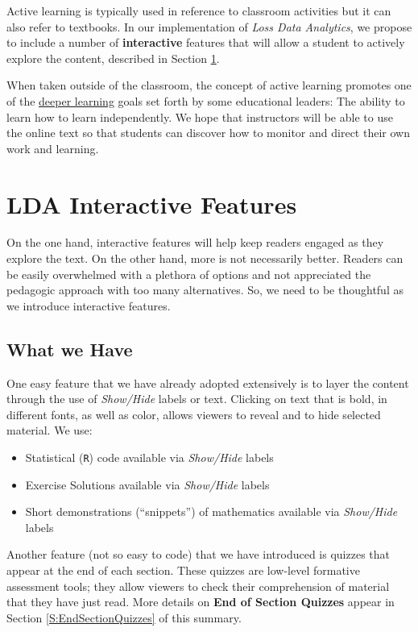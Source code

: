 \documentclass[
]{book}
\providecommand{\tightlist}{%
  \setlength{\itemsep}{0pt}\setlength{\parskip}{0pt}}
\begin{document}
Active learning is typically used in reference to classroom activities but it can also refer to textbooks. In our implementation of \emph{Loss Data Analytics}, we propose to include a number of \textbf{interactive} features that will allow a student to actively explore the content, described in Section \ref{S:Features}.

When taken outside of the classroom, the concept of active learning promotes one of the \href{http://www.hewlett.org/programs/education/deeper-learning}{deeper learning} goals set forth by some educational leaders: The ability to learn how to learn independently. We hope that instructors will be able to use the online text so that students can discover how to monitor and direct their own work and learning.

\hypertarget{S:Features}{%
\section{LDA Interactive Features}\label{S:Features}}

On the one hand, interactive features will help keep readers engaged as they explore the text. On the other hand, more is not necessarily better. Readers can be easily overwhelmed with a plethora of options and not appreciated the pedagogic approach with too many alternatives. So, we need to be thoughtful as we introduce interactive features.

\hypertarget{what-we-have}{%
\subsection{What we Have}\label{what-we-have}}

One easy feature that we have already adopted extensively is to layer the content through the use of \emph{Show/Hide} labels or text. Clicking on text that is bold, in different fonts, as well as color, allows viewers to reveal and to hide selected material. We use:

\begin{itemize}
\tightlist
\item
  Statistical (\texttt{R}) code available via \emph{Show/Hide} labels
\item
  Exercise Solutions available via \emph{Show/Hide} labels
\item
  Short demonstrations (``snippets'') of mathematics available via \emph{Show/Hide} labels
\end{itemize}

Another feature (not so easy to code) that we have introduced is quizzes that appear at the end of each section. These quizzes are low-level formative assessment tools; they allow viewers to check their comprehension of material that they have just read. More details on \textbf{End of Section Quizzes} appear in Section \ref{S:EndSectionQuizzes} of this summary.
\end{document}
